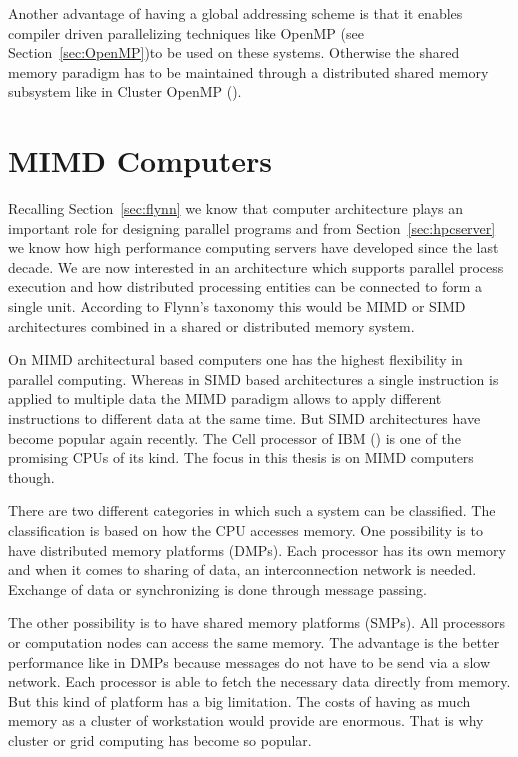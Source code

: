 Another advantage of having a global addressing scheme is that it
enables compiler driven parallelizing techniques like OpenMP (see
Section~\ref{sec:OpenMP})to be used on these systems. Otherwise the
shared memory paradigm has to be maintained through a distributed
shared memory subsystem like in Cluster OpenMP
(\cite{hoeflinger06clusterOpenMP}).

\section{MIMD Computers}
\label{sec:mimd_computers}

Recalling Section~\ref{sec:flynn} we know that computer architecture
plays an important role for designing parallel programs and from  
Section~\ref{sec:hpcserver} we know how high performance computing
servers have developed since the last decade. We are now
interested in an architecture which supports parallel process execution
and how distributed processing entities can be connected to
form a single unit. According to Flynn's taxonomy this would be MIMD
or SIMD architectures combined in a shared or distributed memory system.


On MIMD architectural based computers one has the highest flexibility
in parallel computing. Whereas in SIMD based architectures a single
instruction is applied to multiple data the MIMD paradigm allows to
apply different instructions to different data at the same time. But
SIMD architectures have become popular again recently. The Cell
processor of IBM (\cite{kahle05cell}) is one of the promising CPUs of
its kind. The focus in 
this thesis is on MIMD computers though.


There are two different categories in which such a system can be
classified. The classification is based on how the CPU accesses
memory. One possibility is to have distributed memory platforms (DMPs). Each
processor has its own memory and when it comes to sharing of data, an
interconnection network is needed. Exchange of data or synchronizing
is done through message passing.

The other possibility is to have shared memory platforms (SMPs). All
processors or computation nodes can access the same memory. The
advantage is the better performance like in DMPs because messages do not
have to be send via a slow network. Each processor is able to
fetch the necessary data directly from memory. But this kind of platform
has a big limitation. The costs of having as much memory as a cluster
of workstation would provide are enormous. That is why cluster or
grid computing has become so popular.

